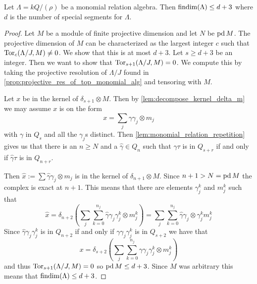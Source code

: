 \begin{theorem}\cite[Corollary~2.4]{GKK91}\label{thm:monomial_algebra_satisafies_FDC}
	Let $\Lambda = kQ/(\rho)$ be a monomial relation algebra. Then $\operatorname{findim}(\Lambda) \leq d+3$ where $d$ is the number of special segments for $\Lambda$.
	\begin{proof}
		Let $M$ be a module of finite projective dimension and let $N$ be $\operatorname{pd} M$. The projective dimension of $M$ can be characterized as the largest integer $c$ such that $\operatorname{Tor}_c(\Lambda/J, M) \neq 0$. We show that this is at most $d+3$. Let $s \geq d+3$ be an integer. Then we want to show that $\operatorname{Tor}_{s+1}(\Lambda/J, M)=0$. We compute this by taking the projective resolution of $\Lambda/J$ found in \cref{prop:projective_res_of_top_monomial_alg} and tensoring with $M$.
		\begin{center}
		\end{center}
		Let $x$ be in the kernel of $\delta_{s+1}\otimes M$. Then by \cref{lem:decompose_kernel_delta_m} we may assume $x$ is on the form
		$$x = \sum_j \gamma \gamma_j \otimes m_j$$
		with $\gamma$ in $Q_s$ and all the $\gamma_j$s distinct. Then \cref{lem:monomial_relation_repetition} gives us that there is an $n \geq N$ and a $\hat{\gamma} \in Q_n$ such that $\gamma\tau$ is in $Q_{s+r}$ if and only if $\hat{\gamma}\tau$ is in $Q_{n+r}$.
		
		Then $\hat{x} := \sum \hat{\gamma}\gamma_j \otimes m_j$ is in the kernel of $\delta_{n+1}\otimes M$. Since $n+1>N=\operatorname{pd} M$ the complex is exact at $n+1$. This means that there are elements $\gamma_j^k$ and $m_j^k$ such that
		$$\hat{x} = \delta_{n+2} \left(\sum_j \sum_{k=0}^{n_j} \hat{\gamma}\gamma_j\gamma_j^k \otimes m_j^k\right) = 
		\sum_j \sum_{k=0}^{n_j} \hat{\gamma}\gamma_j \otimes \gamma_j^k m_j^k$$
		Since $\hat{\gamma}\gamma_j\gamma_j^k$ is in $Q_{n+2}$ if and only if $\gamma\gamma_j\gamma_j^k$ is in $Q_{s+2}$ we have that
		$$x = \delta_{s+2} \left(\sum_j \sum_{k=0}^{n_j} {\gamma}\gamma_j\gamma_j^k \otimes m_j^k\right)$$
		and thus $\operatorname{Tor}_{s+1}(\Lambda/J, M)=0$ so $\operatorname{pd} M \leq d+3$. Since $M$ was arbitrary this means that $\operatorname{findim}(\Lambda) \leq d+3$. 
	\end{proof}
\end{theorem}



